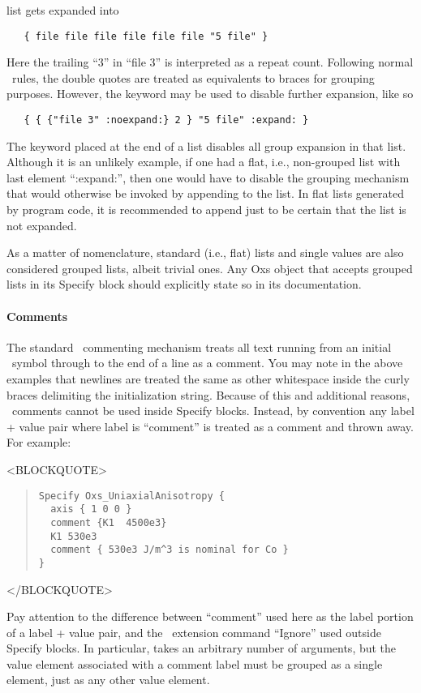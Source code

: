 list gets expanded into
\begin{verbatim}
   { file file file file file file "5 file" }
\end{verbatim}
Here the trailing ``3'' in ``file 3'' is interpreted as a repeat count.
Following normal \Tcl\ rules, the double quotes are treated as equivalents
to braces for grouping purposes.  However, the keyword 
may be used to disable further expansion, like so
\begin{verbatim}
   { { {"file 3" :noexpand:} 2 } "5 file" :expand: }
\end{verbatim}
The  keyword placed at the end of a list disables all
group expansion in that list.  Although it is an unlikely example,
if one had a flat, i.e., non-grouped list with last element ``:expand:'',
then one would have to disable the grouping mechanism that would
otherwise be invoked by appending  to the list.  In
flat lists generated by program code, it is recommended to append
 just to be certain that the list is not expanded.

As a matter of nomenclature, standard (i.e., flat) lists and single
values are also considered grouped lists, albeit trivial ones.  Any Oxs
object that accepts grouped lists in its Specify block should explicitly
state so in its documentation.

\paragraph{Comments}%
\label{par:specifyComments}
The standard \Tcl\ commenting mechanism treats all text running from an
initial \lb\ symbol through to the end of a line as a comment.  You may
note in the above examples that newlines are treated the same as
other whitespace inside the curly braces delimiting the 
initialization string.  Because of this and additional reasons, \Tcl\
comments cannot be used inside Specify blocks.  Instead, by
convention any label + value pair where label is ``comment'' is treated
as a comment and thrown away.  For example:
\begin{rawhtml}<BLOCKQUOTE>\end{rawhtml}
\begin{quote}
\begin{verbatim}
Specify Oxs_UniaxialAnisotropy {
  axis { 1 0 0 }
  comment {K1  4500e3}
  K1 530e3
  comment { 530e3 J/m^3 is nominal for Co }
}
\end{verbatim}
\end{quote}
\begin{rawhtml}</BLOCKQUOTE>\end{rawhtml}
Pay attention to the difference between ``comment'' used here as the
label portion of a label + value pair, and the \MIF\ extension command
``Ignore'' used outside Specify blocks.  In particular, \cd{Ignore}
takes an arbitrary number of arguments, but the value element associated
with a comment label must be grouped as a single element, just as any
other value element.

